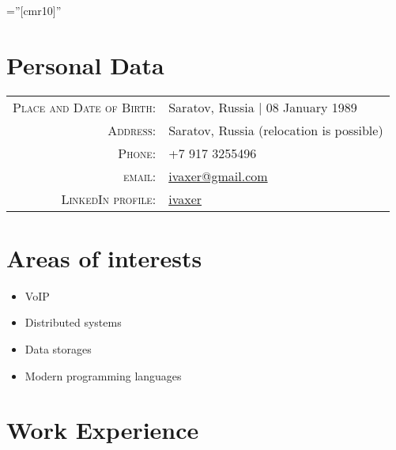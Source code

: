 \documentclass[a4paper,10pt]{article}
\begin{document}
\pagestyle{empty}

\font\fb=''[cmr10]''

\par{\bigskip\par}


\section{Personal Data}

\begin{tabular}{rl}
    \textsc{Place and Date of Birth:} & Saratov, Russia  | 08 January 1989 \\
    \textsc{Address:}   & Saratov, Russia (relocation is possible) \\
    \textsc{Phone:}     & +7 917 3255496\\
    \textsc{email:}     & \href{mailto:ivaxer@gmail.com}{ivaxer@gmail.com} \\
    \textsc{LinkedIn profile:} & \href{http://www.linkedin.com/in/ivaxer}{ivaxer}
\end{tabular}


\section{Areas of interests}
\begin{itemize}
\item VoIP
\item Distributed systems
\item Data storages
\item Modern programming languages
\end{itemize}


\section{Work Experience}
\end{document}
